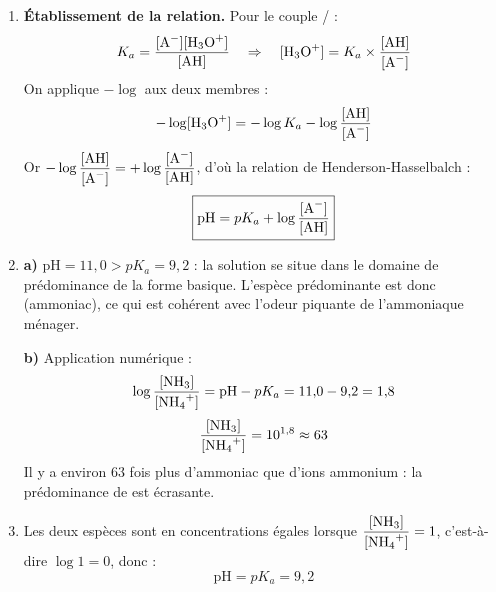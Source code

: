\documentclass[11pt]{article}
\newcommand{\cle}[1]{{\popxbold\color{popdark}#1}}
\begin{document}
\begin{corrige}
\begin{enumerate}
\item \textbf{Établissement de la relation.} Pour le couple / :
\[ K_a = \frac{[\ce{A-}][\ce{H3O+}]}{[\ce{AH}]} \quad \Rightarrow \quad [\ce{H3O+}] = K_a \times \frac{[\ce{AH}]}{[\ce{A-}]} \]
On applique $-\log$ aux deux membres :
\[ -\log[\ce{H3O+}] = -\log K_a - \log\frac{[\ce{AH}]}{[\ce{A-}]} \]
Or $-\log\dfrac{[\ce{AH}]}{[\ce{A-}]} = +\log\dfrac{[\ce{A-}]}{[\ce{AH}]}$, d'où la \cle{relation de Henderson-Hasselbalch} :
\[ \boxed{\mathrm{pH} = pK_a + \log\frac{[\ce{A-}]}{[\ce{AH}]}} \]

\item \textbf{a)} $\mathrm{pH} = 11{,}0 > pK_a = 9{,}2$ : la solution se situe dans le \cle{domaine de prédominance} de la forme basique. L'espèce prédominante est donc \textbf{} (ammoniac), ce qui est cohérent avec l'odeur piquante de l'ammoniaque ménager.

\textbf{b)} Application numérique :
\[ \log\frac{[\ce{NH3}]}{[\ce{NH4+}]} = \mathrm{pH} - pK_a = 11{,}0 - 9{,}2 = 1{,}8 \]
\[ \frac{[\ce{NH3}]}{[\ce{NH4+}]} = 10^{1{,}8} \approx 63 \]
Il y a environ $63$ fois plus d'ammoniac que d'ions ammonium : la prédominance de  est écrasante.

\item Les deux espèces sont en concentrations égales lorsque $\dfrac{[\ce{NH3}]}{[\ce{NH4+}]} = 1$, c'est-à-dire $\log 1 = 0$, donc :
\[ \mathrm{pH} = pK_a = 9{,}2 \]
\end{enumerate}
\end{corrige}
\end{document}
